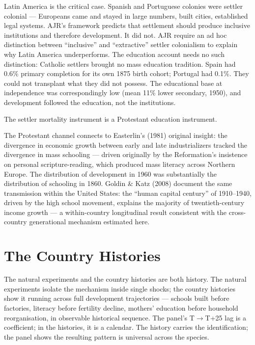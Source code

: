 \documentclass[12pt,letterpaper]{article}
\begin{document}
Latin America is the critical case. Spanish and Portuguese colonies were
settler colonial --- Europeans came and stayed in large numbers, built
cities, established legal systems. AJR's framework predicts that
settlement should produce inclusive institutions and therefore
development. It did not. AJR require an ad hoc distinction between
``inclusive'' and ``extractive'' settler colonialism to explain why Latin
America underperforms. The education account needs no such distinction:
Catholic settlers brought no mass education tradition. Spain had 0.6\%
primary completion for its own 1875 birth cohort; Portugal had 0.1\%.
They could not transplant what they did not possess. The educational
base at independence was correspondingly low (mean 11\% lower secondary,
1950), and development followed the education, not the institutions.

The settler mortality instrument is a
Protestant education instrument.

The Protestant channel connects to Easterlin's (1981) original insight:
the divergence in economic growth between early and late industrializers
tracked the divergence in mass schooling --- driven originally by the
Reformation's insistence on personal scripture-reading, which produced
mass literacy across Northern Europe. The distribution of development in
1960 was substantially the distribution of schooling in 1860. Goldin \&
Katz (2008) document the same transmission within the United States: the
``human capital century'' of 1910--1940, driven by the high school
movement, explains the majority of twentieth-century income growth --- a
within-country longitudinal result consistent with the cross-country
generational mechanism estimated here.

\section{The Country Histories}\label{country-histories}

The natural experiments and the country histories are both history. The natural experiments isolate the mechanism inside single shocks; the country histories show it running across full development trajectories --- schools built before factories, literacy before fertility decline, mothers' education before household reorganisation, in observable historical sequence. The panel's T$\to$T+25 lag is a coefficient; in the histories, it is a calendar. The history carries the identification; the panel shows the resulting pattern is universal across the species.
\end{document}
